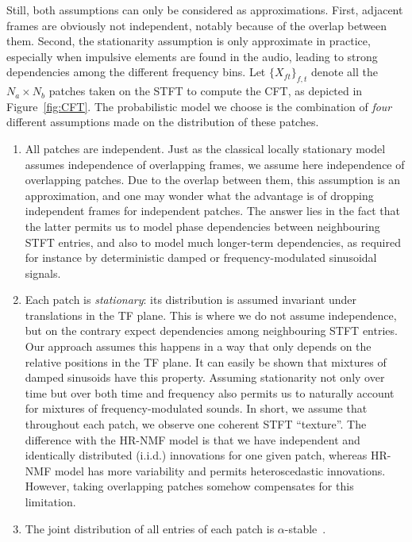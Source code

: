 Still, both assumptions can only be considered as approximations.
First, adjacent frames are obviously not independent, notably because
of the overlap between them. Second, the stationarity assumption is
only approximate in practice, especially when impulsive elements are
found in the audio, leading to strong dependencies among the different
frequency bins. Let $\{ X_{ft}\} _{f,t}$
denote all the $N_{a}\times N_{b}$ patches taken on the STFT to compute
the CFT, as depicted in Figure~\ref{fig:CFT}. The probabilistic
model we choose is the combination of \emph{four} different assumptions
made on the distribution of these patches.

\begin{enumerate}[leftmargin=0cm,itemindent=.5cm,labelwidth=\itemindent,labelsep=0cm,align=left]
\item All patches are independent. Just as the classical locally stationary
model~\cite{liutkus11t} assumes independence of overlapping frames,
we assume here independence of overlapping patches. Due to the
overlap between them, this assumption is an approximation,
and one may wonder what the advantage is of dropping independent frames
for independent patches. The answer lies in the fact that the latter
permits us to model phase dependencies between neighbouring STFT entries,
and also to model much longer-term dependencies, as required for instance
by deterministic damped or frequency-modulated sinusoidal signals.\label{enu:assumption_independent_patches}
\item Each patch is \emph{stationary}: its distribution
is assumed invariant under translations in the TF plane. This is where we do not assume independence, but on the contrary expect dependencies among neighbouring STFT entries. Our approach assumes this happens in a way that only depends on the relative positions in
the TF plane. It can easily be shown that mixtures of
damped sinusoids have this property. Assuming stationarity not only over time but over both time and frequency
also permits us to naturally account for mixtures of frequency-modulated
sounds. In short, we assume that throughout each patch, we observe
one coherent STFT ``texture''. The difference with the HR-NMF model is that we have independent and identically
distributed (i.i.d.) innovations for one given patch, whereas HR-NMF model has more variability and permits heteroscedastic innovations. However, taking overlapping patches somehow compensates for
this limitation.\label{enu:assumption_stationary}
\item The joint distribution of all entries of each patch is $\alpha$-stable~\cite{samoradnitsky1994stable}.

\end{enumerate}
